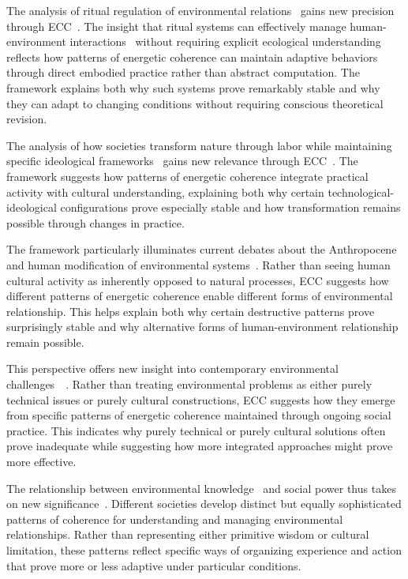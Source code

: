 The analysis of ritual regulation of environmental relations~ gains new precision through ECC~\cite{rappaport1999ritual,kapferer2004ritual}. The insight that ritual systems can effectively manage human-environment interactions~ without requiring explicit ecological understanding reflects how patterns of energetic coherence can maintain adaptive behaviors through direct embodied practice rather than abstract computation. The framework explains both why such systems prove remarkably stable and why they can adapt to changing conditions without requiring conscious theoretical revision.

The analysis of how societies transform nature through labor while maintaining specific ideological frameworks~ gains new relevance through ECC~\cite{latour2005reassembling,ingold2011being}. The framework suggests how patterns of energetic coherence integrate practical activity with cultural understanding, explaining both why certain technological-ideological configurations prove especially stable and how transformation remains possible through changes in practice.

The framework particularly illuminates current debates about the Anthropocene and human modification of environmental systems~\cite{tsing2015mushroom,haraway2016staying}. Rather than seeing human cultural activity as inherently opposed to natural processes, ECC suggests how different patterns of energetic coherence enable different forms of environmental relationship. This helps explain both why certain destructive patterns prove surprisingly stable and why alternative forms of human-environment relationship remain possible.

This perspective offers new insight into contemporary environmental challenges~~\cite{tsing2015mushroom,kohn2013how}. Rather than treating environmental problems as either purely technical issues or purely cultural constructions, ECC suggests how they emerge from specific patterns of energetic coherence maintained through ongoing social practice. This indicates why purely technical or purely cultural solutions often prove inadequate while suggesting how more integrated approaches might prove more effective.

The relationship between environmental knowledge~ and social power thus takes on new significance~\cite{palsson2015nature,foucault1980power}. Different societies develop distinct but equally sophisticated patterns of coherence for understanding and managing environmental relationships. Rather than representing either primitive wisdom or cultural limitation, these patterns reflect specific ways of organizing experience and action that prove more or less adaptive under particular conditions.

